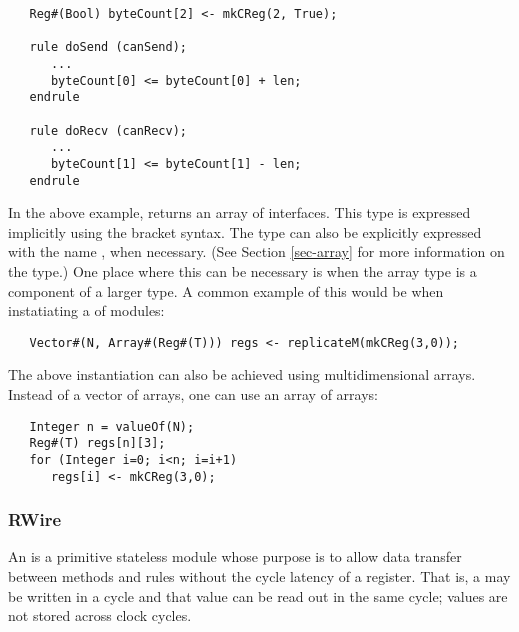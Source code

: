 \begin{verbatim}
   Reg#(Bool) byteCount[2] <- mkCReg(2, True);

   rule doSend (canSend);
      ...
      byteCount[0] <= byteCount[0] + len;
   endrule

   rule doRecv (canRecv);
      ...
      byteCount[1] <= byteCount[1] - len;
   endrule
\end{verbatim}

In the above example,  returns an array of  interfaces.
This type is expressed implicitly using the bracket syntax.
The type can also be explicitly expressed with the name , when
necessary. (See Section \ref{sec-array} for more information on the 
type.)  One place where this can be necessary is when the array type is a
component of a larger type.  A common example of this would be when
instatiating a  of  modules:

\begin{verbatim}
   Vector#(N, Array#(Reg#(T))) regs <- replicateM(mkCReg(3,0));
\end{verbatim}

The above instantiation can also be achieved using multidimensional arrays.
Instead of a vector of arrays, one can use an array of arrays:

\begin{verbatim}
   Integer n = valueOf(N);
   Reg#(T) regs[n][3];
   for (Integer i=0; i<n; i=i+1)
      regs[i] <- mkCReg(3,0);
\end{verbatim}



\subsubsection{RWire}


\label{lib-rwire}

An  is a primitive stateless module whose purpose is to allow     
data transfer between methods and rules without    
the cycle latency of a register.  That is, a  may be written
in a cycle and that value can be read out in the same cycle; values
are not stored across clock cycles. 

